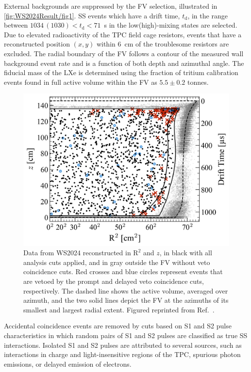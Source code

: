 External backgrounds are suppressed by the FV selection, illustrated in \autoref{fig:WS2024Result/fig1}. SS events which have a drift time, $t_\text{d}$, in the range between $1034\,(1030)<t_\text{d}<71$~\textmu s in the low(high)-mixing states are selected. Due to elevated radioactivity of the TPC field cage resistors, events that have a reconstructed position $(x,y)$ within 6~cm of the troublesome resistors are excluded. The radial boundary of the FV follows a contour of the measured wall background event rate and is a function of both depth and azimuthal angle. The fiducial mass of the LXe is determined using the fraction of tritium calibration events found in full active volume within the FV as $5.5\pm0.2$ tonnes.
\begin{figure}[t!]
    \centering
    \includegraphics[width=0.7\linewidth]{figures/WS2024Result/figure1.png}
    \caption[Data from WS2024 reconstructed in $\text{R}^2$ and $z$ in the TPC.]{Data from WS2024 reconstructed in $\text{R}^2$ and $z$, in black with all analysis cuts applied, and in gray outside the FV without veto coincidence cuts. Red crosses and blue circles represent events that are vetoed by the prompt and delayed veto coincidence cuts, respectively. The dashed line shows the active volume, averaged over azimuth, and the two solid lines depict the FV at the azimuths of its smallest and largest radial extent. Figured reprinted from Ref.~\cite{LZCollaboration:2024lux}.}
    \label{fig:WS2024Result/fig1}
\end{figure}
Accidental coincidence events are removed by cuts based on S1 and S2 pulse characteristics in which random pairs of S1 and S2 pulses are classified as true SS interactions. Isolated S1 and S2 pulses are attributed to several sources, such as interactions in charge and light-insensitive regions of the TPC, spurious photon emissions, or delayed emission of electrons.


